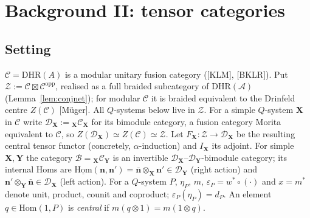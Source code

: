 \documentclass[11pt]{article}
\theoremstyle{definition}
\theoremstyle{remark}
\newcommand{\cA}{\mathcal A}
\begin{document}
\section{Background II: tensor categories}\label{sec:tensor}
\subsection{Setting}
$\mathcal C=\mathrm{DHR}(A)$ is a modular unitary fusion category ([KLM], [BKLR]). Put $\mathcal Z:=\mathcal C\boxtimes\mathcal C^{\mathrm{opp}}$, realised as a full braided subcategory of $\mathrm{DHR}(\cA)$ (Lemma~\ref{lem:conjnet}); for modular $\mathcal C$ it is braided equivalent to the Drinfeld centre $Z(\mathcal C)$ [M\"uger]. All $Q$-systems below live in $\mathcal Z$. For a simple $Q$-system $\mathbf X$ in $\mathcal C$ write $\mathcal D_{\mathbf X}:={}_{\mathbf X}\mathcal C_{\mathbf X}$ for its bimodule category, a fusion category Morita equivalent to $\mathcal C$, so $Z(\mathcal D_{\mathbf X})\simeq Z(\mathcal C)\simeq\mathcal Z$. Let $F_{\mathbf X}\colon\mathcal Z\to\mathcal D_{\mathbf X}$ be the resulting central tensor functor (concretely, $\alpha$-induction) and $I_{\mathbf X}$ its adjoint. For simple $\mathbf X,\mathbf Y$ the category $\mathcal B={}_{\mathbf X}\mathcal C_{\mathbf Y}$ is an invertible $\mathcal D_{\mathbf X}$--$\mathcal D_{\mathbf Y}$-bimodule category; its internal Homs are $\underline{\mathrm{Hom}}(\mathbf n,\mathbf n')=\bar{\mathbf n}\otimes_{\mathbf X}\mathbf n'\in\mathcal D_{\mathbf Y}$ (right action) and $\mathbf n'\otimes_{\mathbf Y}\bar{\mathbf n}\in\mathcal D_{\mathbf X}$ (left action). For a $Q$-system $P$, $\eta_P$, $m$, $\varepsilon_P=w^*\circ(\cdot)$ and $x=m^*$ denote unit, product, counit and coproduct; $\varepsilon_P(\eta_P)=d_P$. An element $q\in\mathrm{Hom}(1,P)$ is \emph{central} if $m(q\otimes1)=m(1\otimes q)$.
\end{document}
